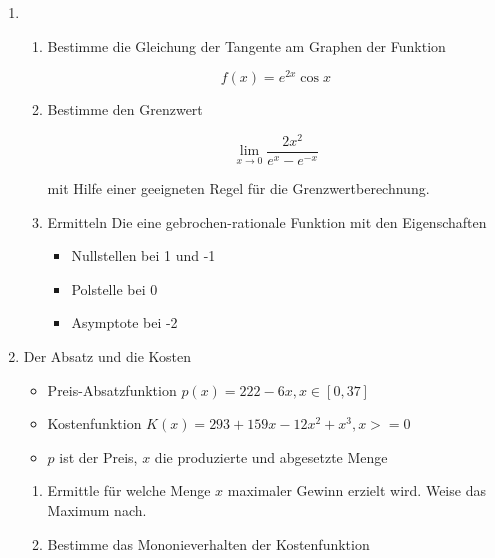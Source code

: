 \documentclass[12pt,a4paper]{scrreprt}
\begin{document}

\begin{enumerate}

\item %

\begin{enumerate}

\item
Bestimme die Gleichung der Tangente am Graphen der Funktion

\[
f(x) = e^{2x}\cos x
\]

\item %
Bestimme den Grenzwert

\[
\lim_{x \rightarrow 0}\left. \frac{2x^2}{e^x-e^{-x}} \right. 
\]

mit Hilfe einer geeigneten Regel für die Grenzwertberechnung.


\item
Ermitteln Die eine gebrochen-rationale Funktion mit den Eigenschaften

\begin{itemize}
\item Nullstellen bei 1 und -1 %
\item Polstelle bei 0 %
\item Asymptote bei -2 %
\end{itemize}

\end{enumerate}

\item %
Der Absatz und die Kosten%

\begin{itemize}
\item Preis-Absatzfunktion $p(x) = 222-6x, x \in [ 0, 37 ]$
\item Kostenfunktion $K(x)=293 + 159x-12x^2+x^3, x>=0$
\item $p$ ist der Preis, $x$ die produzierte und abgesetzte Menge
\end{itemize}

\begin{enumerate}
\item 
Ermittle für welche Menge $x$ maximaler Gewinn erzielt wird. Weise das Maximum nach. %

\item 
Bestimme das Mononieverhalten der Kostenfunktion


\end{enumerate}
\end{enumerate}
\end{document}
